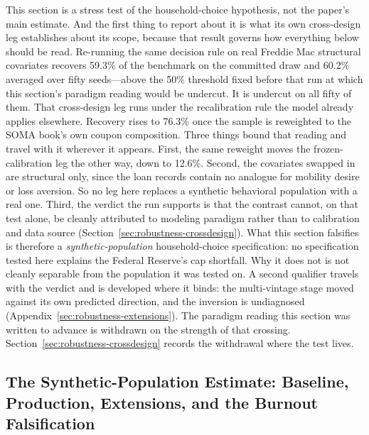 \documentclass[12pt]{article}
\begin{document}
This section is a stress test of the household-choice hypothesis, not the paper's main estimate. And the first thing to report about it is what its own cross-design leg establishes about its scope, because that result governs how everything below should be read. Re-running the same decision rule on real Freddie Mac structural covariates recovers 59.3\% of the benchmark on the committed draw and 60.2\% averaged over fifty seeds---above the 50\% threshold fixed before that run at which this section's paradigm reading would be undercut. It is undercut on all fifty of them. That cross-design leg runs under the recalibration rule the model already applies elsewhere. Recovery rises to 76.3\% once the sample is reweighted to the SOMA book's own coupon composition. Three things bound that reading and travel with it wherever it appears. First, the same reweight moves the frozen-calibration leg the other way, down to 12.6\%. Second, the covariates swapped in are structural only, since the loan records contain no analogue for mobility desire or loss aversion. So no leg here replaces a synthetic behavioral population with a real one. Third, the verdict the run supports is that the contrast cannot, on that test alone, be cleanly attributed to modeling paradigm rather than to calibration and data source (Section~\ref{sec:robustness-crossdesign}). What this section falsifies is therefore a \emph{synthetic-population} household-choice specification: no specification tested here explains the Federal Reserve's cap shortfall. Why it does not is not cleanly separable from the population it was tested on. A second qualifier travels with the verdict and is developed where it binds: the multi-vintage stage moved against its own predicted direction, and the inversion is undiagnosed (Appendix~\ref{sec:robustness-extensions}). The paradigm reading this section was written to advance is withdrawn on the strength of that crossing. Section~\ref{sec:robustness-crossdesign} records the withdrawal where the test lives.

\subsection{The Synthetic-Population Estimate: Baseline, Production, Extensions, and the Burnout Falsification}\label{sec:abm-results}
\end{document}
